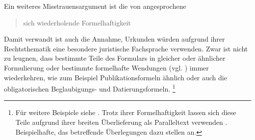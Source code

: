 Ein weiteres Misstrauensargument ist die von \citeauthor{wegera2000}
angesprochene \blockcquote[1311]{wegera2000}{sich wiederholende
Formelhaftigkeit}. Damit verwandt ist auch die Annahme, Urkunden würden
aufgrund ihrer Rechtsthematik eine besondere juristische Fachsprache verwenden.
Zwar ist nicht zu leugnen, dass bestimmte Teile des Formulars in gleicher oder
ähnlicher Formulierung oder bestimmte formelhafte Wendungen (vgl.
) immer wiederkehren, wie zum Beispiel
Publikationsformeln ähnlich
oder auch die obligatorischen Beglaubigungs- und Datierungsformeln.%
%
	\footnote{Für weitere Beispiele siehe \citet[10, Anm.~5--8]{schulze2011}.
	Trotz ihrer Formelhaftigkeit lassen sich diese Teile aufgrund ihrer breiten
	Überlieferung als Paralleltext verwenden
	\autocite[siehe][]{cysouwwaelchli2007}. Beispielhafte, das \CAO{}
	betreffende Überlegungen dazu stellen \citet[174--175]{beckerschallert2022b} an.}
%
% 
% 
% 
